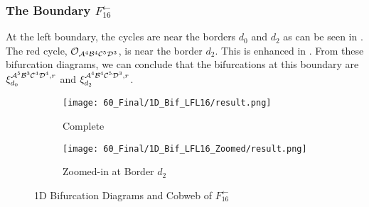 \subsubsection{The Boundary $F_{16}^\leftarrow$}

At the left boundary, the cycles are near the borders $d_0$ and $d_2$ as can be seen in .
The red cycle, $\mathcal{O}_{\mathcal{A}^4\mathcal{B}^4\mathcal{C}^5\mathcal{D}^3}$, is near the border $d_2$.
This is enhanced in .
From these bifurcation diagrams, we can conclude that the bifurcations at this boundary are $\xi_{d_0}^{\mathcal{A}^5\mathcal{B}^3\mathcal{C}^4\mathcal{D}^4, r}$ and $\xi_{d_2}^{\mathcal{A}^4\mathcal{B}^4\mathcal{C}^5\mathcal{D}^3, r}$.

\begin{figure}
    \centering
    \begin{subfigure}{0.4\textwidth}
        \centering
        \texttt{[image: 60\_Final/1D\_Bif\_LFL16/result.png]}
        \caption{Complete}
        \label{fig:final.bifurcation.F.left}
    \end{subfigure}
    \begin{subfigure}{0.4\textwidth}
        \centering
        \texttt{[image: 60\_Final/1D\_Bif\_LFL16\_Zoomed/result.png]}
        \caption{Zoomed-in at Border $d_2$}
        \label{fig:final.bifurcation.F.left.zoomed}
    \end{subfigure}
    \caption{1D Bifurcation Diagrams and Cobweb of $F_{16}^\leftarrow$}
\end{figure}


